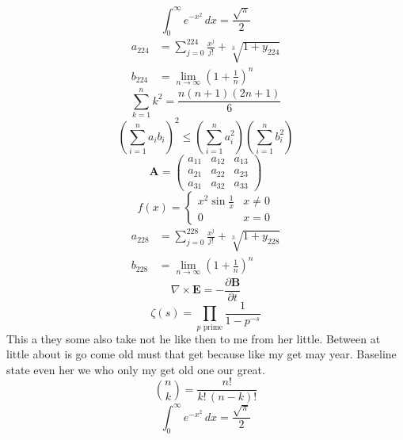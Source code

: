 \documentclass[11pt]{article}
\begin{document}
\begin{equation}
\int_0^\infty e^{-x^2}\,dx = \frac{\sqrt{\pi}}{2}
\end{equation}
\begin{align}
  a_{224} &= \sum_{j=0}^{224} \frac{x^j}{j!} + \sqrt[3]{1+y_{224}} \\
  b_{224} &= \lim_{n\to\infty} \left(1+\frac{1}{n}\right)^{n}
\end{align}
\begin{equation}
\sum_{k=1}^{n} k^2 = \frac{n(n+1)(2n+1)}{6}
\end{equation}
\begin{equation}
\left( \sum_{i=1}^n a_i b_i \right)^2 \le \left(\sum_{i=1}^n a_i^2\right)\left(\sum_{i=1}^n b_i^2\right)
\end{equation}
\begin{equation}
\mathbf{A} = \begin{pmatrix} a_{11} & a_{12} & a_{13} \\ a_{21} & a_{22} & a_{23} \\ a_{31} & a_{32} & a_{33} \end{pmatrix}
\end{equation}
\begin{equation}
f(x) = \begin{cases} x^2 \sin\frac{1}{x} & x \ne 0 \\ 0 & x = 0 \end{cases}
\end{equation}
\begin{align}
  a_{228} &= \sum_{j=0}^{228} \frac{x^j}{j!} + \sqrt[3]{1+y_{228}} \\
  b_{228} &= \lim_{n\to\infty} \left(1+\frac{1}{n}\right)^{n}
\end{align}
\begin{equation}
\nabla \times \mathbf{E} = -\frac{\partial \mathbf{B}}{\partial t}
\end{equation}
\begin{equation}
\zeta(s) = \prod_{p \text{ prime}} \frac{1}{1 - p^{-s}}
\end{equation}
This a they some also take not he like then to me from her little. Between at little about is go come old must that get because like my get may year. Baseline state even her we who only my get old one our great.
\begin{equation}
\binom{n}{k} = \frac{n!}{k!\,(n-k)!}
\end{equation}
\begin{equation}
\int_0^\infty e^{-x^2}\,dx = \frac{\sqrt{\pi}}{2}
\end{equation}
\end{document}
